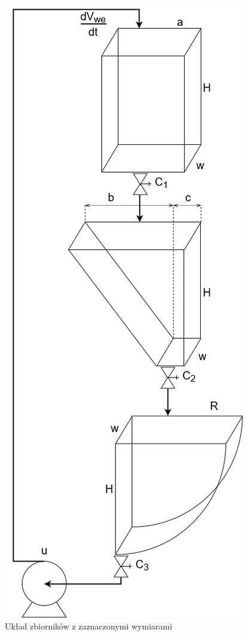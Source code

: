 \begin{figure}[hpt]
	\centering
	\includegraphics[scale=.5]{Grafika/schemat_zbiornikow}
	\caption{Układ zbiorników z zaznaczonymi wymiarami}\label{fig:zbiorniki}
\end{figure}




